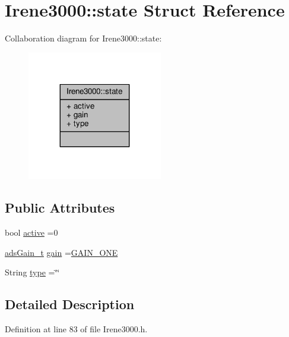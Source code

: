\hypertarget{struct_irene3000_1_1state}{}\section{Irene3000\+:\+:state Struct Reference}
\label{struct_irene3000_1_1state}


Collaboration diagram for Irene3000\+:\+:state\+:\nopagebreak
\begin{figure}[H]
\begin{center}
\leavevmode
\includegraphics[width=167pt]{d8/d72/struct_irene3000_1_1state__coll__graph}
\end{center}
\end{figure}
\subsection*{Public Attributes}
\begin{DoxyCompactItemize}
\item 
bool \hyperlink{struct_irene3000_1_1state_a879828ace7e7a7bc91ff703bfee36599}{active} =0
\item 
\hyperlink{_cool_adafruit___a_d_s1015_8h_a3d6c0e15829a207b9155890811fa4781}{ads\+Gain\+\_\+t} \hyperlink{struct_irene3000_1_1state_a1ecf69d38cb31ecaf6b3602a3f3e93cb}{gain} =\hyperlink{_cool_adafruit___a_d_s1015_8h_a3d6c0e15829a207b9155890811fa4781ab6b0b520637e016e297110bebeb23a54}{G\+A\+I\+N\+\_\+\+O\+NE}
\item 
String \hyperlink{struct_irene3000_1_1state_a9897a7e02727db6351d44006eec73799}{type} =\char`\"{}\char`\"{}
\end{DoxyCompactItemize}


\subsection{Detailed Description}


Definition at line 83 of file Irene3000.\+h.



